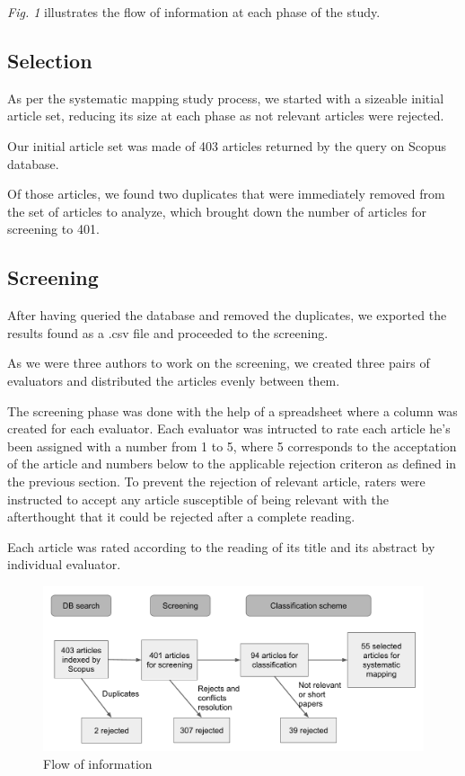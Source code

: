 \documentclass[letterpaper, 10 pt, conference]{ieeeconf}  %
\begin{document}
\textit{Fig. 1} illustrates the flow of information at each phase of the study.

\subsection{Selection}

As per the systematic mapping study process, we started with a sizeable initial
article set, reducing its size at each phase as not relevant articles were rejected.

Our initial article set was made of 403 articles returned by the query on Scopus
database.

Of those articles, we found two duplicates that were immediately removed from
the set of articles to analyze, which brought down the number of articles for
screening to 401.

\subsection{Screening}

After having queried the database and removed the duplicates, we exported the
results found as a .csv file and proceeded to the screening.

As we were three authors to work on the screening, we created three pairs
of evaluators and distributed the articles evenly between them.

The screening phase was done with the help of a spreadsheet where a column was
created for each evaluator.
Each evaluator was intructed to rate each article he's been assigned with a number
from 1 to 5, where 5 corresponds to the acceptation of the article and numbers below
to the applicable rejection criteron as defined in the previous section.
To prevent the rejection of relevant article, raters were instructed to accept
any article susceptible of being relevant with the afterthought that it could be
rejected after a complete reading.

Each article was rated according to the reading of its title and its abstract by
individual evaluator.

\begin{figure}[tb]
 \centering
 \includegraphics[scale=0.5]{flow.png}
 \caption{Flow of information}
\end{figure}
\end{document}
